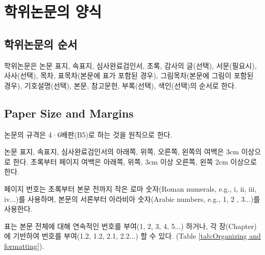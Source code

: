 \documentclass{report}
\begin{document}
\chapter{학위논문의 양식}\label{chap:organizing}

\section{학위논문의 순서}\label{sec:order}
학위논문은 논문 표지, 속표지, 심사완료검인서, 초록, 감사의 글(선택), 서문(필요시), 사사(선택), 목차, 표목차(본문에 표가 포함된 경우), 그림목차(본문에 그림이 포함된 경우), 기호설명(선택), 본문, 참고문헌, 부록(선택), 색인(선택)의 순서로 한다.

\section{Paper Size and Margins} \label{sec:papersize}
논문의 규격은 4·6배판(B5)로 하는 것을 원칙으로 한다.

논문 표지, 속표지, 심사완료검인서의 아래쪽, 위쪽, 오른쪽, 왼쪽의 여백은 3cm 이상으로 한다. 초록부터 페이지 여백은 아래쪽, 위쪽, 3cm 이상 오른쪽, 왼쪽 2cm 이상으로 한다.

페이지 번호는 초록부터 본문 전까지 작은 로마 숫자(Roman numerals, e.g., i, ii, iii, iv...)를 사용하며, 본문의 서론부터 아라비아 숫자(Arabic numbers, e.g., 1, 2 , 3...)를 사용한다.

 표는 본문 전체에 대해 연속적인 번호를 부여(1, 2, 3, 4, 5...) 하거나, 각 장(Chapter)에 기반하여 번호를 부여(1.2, 1.2, 2.1, 2.2...) 할 수 있다. (Table \ref{tab:Organizing and formatting}).
\end{document}
